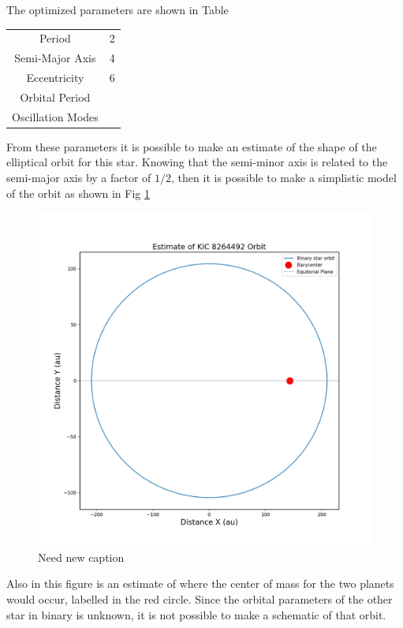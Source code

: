 \documentclass[]{article}
\begin{document}
The optimized parameters are shown in Table 

\begin{tabular}{c|c}
\hline
    Period  & 2  \\
    Semi-Major Axis & 4\\
    Eccentricity & 6\\
    Orbital Period & \\
    Oscillation Modes & \\
\end{tabular}

\noindent
From these parameters it is possible to make an estimate of the shape of the elliptical orbit for this star. Knowing that the semi-minor axis is related to the semi-major axis by a factor of $1/2$, then it is possible to make a simplistic model of the orbit as shown in Fig \ref{fig:Orbit}

\begin{figure}[H]
    \centering
    \includegraphics[width=1\linewidth]{orbit.png}
    \caption{Need new caption}
    \label{fig:Orbit}
\end{figure}
Also in this figure is an estimate of where the center of mass for the two planets would occur, labelled in the red circle. 
Since the orbital parameters of the other star in binary is unknown, it is not possible to make a schematic of that orbit.
\end{document}
